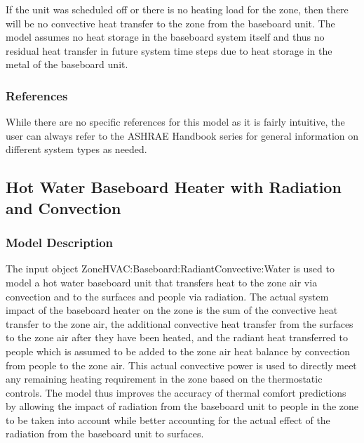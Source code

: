 If the unit was scheduled off or there is no heating load for the zone, then there will be no convective heat transfer to the zone from the baseboard unit. The model assumes no heat storage in the baseboard system itself and thus no residual heat transfer in future system time steps due to heat storage in the metal of the baseboard unit.

\subsubsection{References}\label{references-1-002}

While there are no specific references for this model as it is fairly intuitive, the user can always refer to the ASHRAE Handbook series for general information on different system types as needed.

\subsection{Hot Water Baseboard Heater with Radiation and Convection}\label{hot-water-baseboard-heater-with-radiation-and-convection}

\subsubsection{Model Description}\label{model-description-2-002}

The input object ZoneHVAC:Baseboard:RadiantConvective:Water is used to model a hot water baseboard unit that transfers heat to the zone air via convection and to the surfaces and people via radiation. The actual system impact of the baseboard heater on the zone is the sum of the convective heat transfer to the zone air, the additional convective heat transfer from the surfaces to the zone air after they have been heated, and the radiant heat transferred to people which is assumed to be added to the zone air heat balance by convection from people to the zone air. This actual convective power is used to directly meet any remaining heating requirement in the zone based on the thermostatic controls. The model thus improves the accuracy of thermal comfort predictions by allowing the impact of radiation from the baseboard unit to people in the zone to be taken into account while better accounting for the actual effect of the radiation from the baseboard unit to surfaces.

